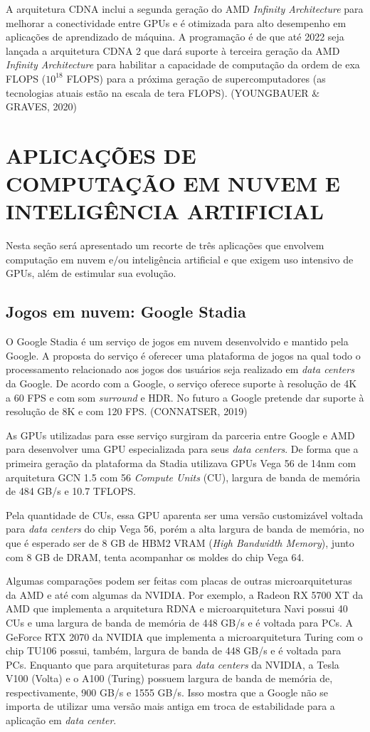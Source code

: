 \documentclass[letterpaper, 10 pt, conference]{ieeeconf}  %
\begin{document}
A arquitetura CDNA inclui a segunda geração do AMD \textit{Infinity Architecture} para melhorar a conectividade entre GPUs e é otimizada para alto desempenho em aplicações de aprendizado de máquina. A programação é de que até 2022 seja lançada a arquitetura CDNA 2 que dará suporte à terceira geração da AMD \textit{Infinity Architecture} para habilitar a capacidade de computação da ordem de exa FLOPS ($10^{18}$ FLOPS) para a próxima geração de supercomputadores (as tecnologias atuais estão na escala de tera FLOPS). (YOUNGBAUER \& GRAVES, 2020)

\section{APLICAÇÕES DE COMPUTAÇÃO EM NUVEM E INTELIGÊNCIA ARTIFICIAL}

Nesta seção será apresentado um recorte de três aplicações que envolvem computação em nuvem e$/$ou inteligência artificial e que exigem uso intensivo de GPUs, além de estimular sua evolução.

\subsection{Jogos em nuvem: Google Stadia}

O Google Stadia é um serviço de jogos em nuvem desenvolvido e mantido pela Google. A proposta do serviço é oferecer uma plataforma de jogos na qual todo o processamento relacionado aos jogos dos usuários seja realizado em \textit{data centers} da Google. De acordo com a Google, o serviço oferece suporte à resolução de 4K a 60 FPS e com som \textit{surround} e HDR. No futuro a Google pretende dar suporte à resolução de 8K e com 120 FPS. (CONNATSER, 2019)

As GPUs utilizadas para esse serviço surgiram da parceria entre Google e AMD para desenvolver uma GPU especializada para seus \textit{data centers}. De forma que a primeira geração da plataforma da Stadia utilizava GPUs Vega 56 de 14nm com arquitetura GCN 1.5 com 56 \textit{Compute Units} (CU), largura de banda de memória de 484 GB/s e 10.7 TFLOPS.

Pela quantidade de CUs, essa GPU aparenta ser uma versão customizável voltada para \textit{data centers} do chip Vega 56, porém a alta largura de banda de memória, no que é esperado ser de 8 GB de HBM2 VRAM (\textit{High Bandwidth Memory}), junto com 8 GB de DRAM, tenta acompanhar os moldes do chip Vega 64. 

Algumas comparações podem ser feitas com placas de outras microarquiteturas da AMD e até com algumas da NVIDIA. Por exemplo, a Radeon RX 5700 XT da AMD que implementa a arquitetura RDNA e microarquitetura Navi possui 40 CUs e uma largura de banda de memória de 448 GB/s e é voltada para PCs. A GeForce RTX 2070 da NVIDIA que implementa a microarquitetura Turing com o chip TU106 possui, também, largura de banda de 448 GB/s e é voltada para PCs. Enquanto que para arquiteturas para \textit{data centers} da NVIDIA, a Tesla V100 (Volta) e o A100 (Turing) possuem largura de banda de memória de, respectivamente, 900 GB/s e 1555 GB/s. Isso mostra que a Google não se importa de utilizar uma versão mais antiga em troca de estabilidade para a aplicação em \textit{data center}.
\end{document}
